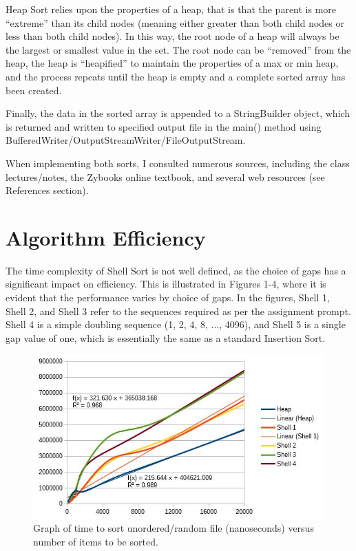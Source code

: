 \documentclass[12pt, titlepage]{article}
\begin{document}
Heap Sort relies upon the properties of a heap, that is that the parent is more ``extreme'' than its child nodes (meaning either greater than both child nodes or less than both child nodes). In this way, the root node of a heap will always be the largest or smallest value in the set. The root node can be ``removed'' from the heap, the heap is ``heapified'' to maintain the properties of a max or min heap, and the process repeats until the heap is empty and a complete sorted array has been created.

Finally, the data in the sorted array is appended to a StringBuilder object, which is returned and written to specified output file in the main() method using BufferedWriter/OutputStreamWriter/FileOutputStream.

When implementing both sorts, I consulted numerous sources, including the class lectures/notes, the Zybooks online textbook, and several web resources (see References section). 



\section{Algorithm Efficiency}

The time complexity of Shell Sort is not well defined, as the choice of gaps has a significant impact on efficiency. This is illustrated in Figures 1-4, where it is evident that the performance varies by choice of gaps. In the figures, Shell 1, Shell 2, and Shell 3 refer to the sequences required as per the assignment prompt. Shell 4 is a simple doubling sequence (1, 2, 4, 8, ..., 4096), and Shell 5 is a single gap value of one, which is essentially the same as a standard Insertion Sort. 

\begin{figure} [!htbp]
	\centering
	\includegraphics[width=5in]{ran-graph}
	\caption{Graph of time to sort unordered/random file (nanoseconds) versus number of items to be sorted.}
\end{figure}
\end{document}
